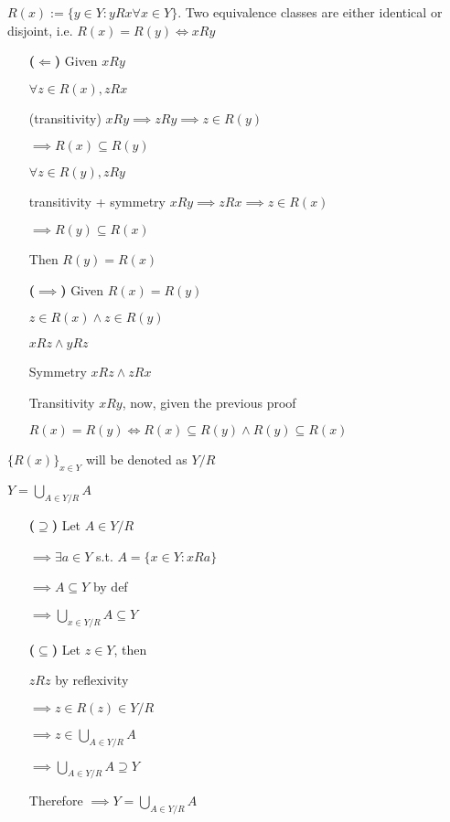 \documentclass{article}
\begin{document}
 $R(x):=\{y\in Y: yRx \forall x\in Y\}$.
Two equivalence classes are either identical or disjoint, i.e. $R(x)=R(y)
\iff xRy$


\begin{itemize}
\item[\bf ($\Longleftarrow$)] Given $xRy$
\item[] $\forall z\in R(x), zRx$
\item[(transitivity)] $xRy\implies zRy\implies z\in R(y)$
\item[] $\implies R(x)\subseteq R(y)$
\item[] 
\item[] $\forall z\in R(y), zRy$
\item[transitivity + symmetry] $xRy\implies zRx\implies z\in R(x)$
\item[] $\implies R(y)\subseteq R(x)$
\item[] Then $R(y)=R(x)$
\item[] 
\item[\bf ($\implies$)] Given $R(x)=R(y)$
\item[] $z\in R(x) \wedge z\in R(y)$
\item[] $xRz \wedge yRz$
\item[Symmetry] $xRz \wedge zRx$
\item[Transitivity] $xRy$, now, given the previous proof
\item[] $R(x)=R(y) \iff R(x)\subseteq R(y) \wedge R(y)\subseteq R(x)$
\end{itemize}

 $\{R(x)\}_{x\in Y}$ will be
denoted as $Y/R$

 $Y=\bigcup_{A\in Y/R}A$

\begin{itemize}
\item[\bf ($\supseteq$)] Let $A\in Y/R$
\item[] $\implies \exists a\in Y$ s.t. $A=\{x\in Y: xRa\}$
\item[] $\implies A\subseteq Y$ by def
\item[] $\implies \bigcup_{x\in Y/R}A\subseteq Y$
\item[]
\item[\bf ($\subseteq$)] Let $z\in Y$, then
\item[] $zRz$ by reflexivity
\item[] $\implies z\in R(z) \in Y/R$
\item[] $\implies z\in\bigcup_{A\in Y/R}A$
\item[] $\implies \bigcup_{A\in Y/R}A \supseteq Y$
\item[] Therefore $\implies Y=\bigcup_{A\in Y/R}A$
\end{itemize}
\end{document}
